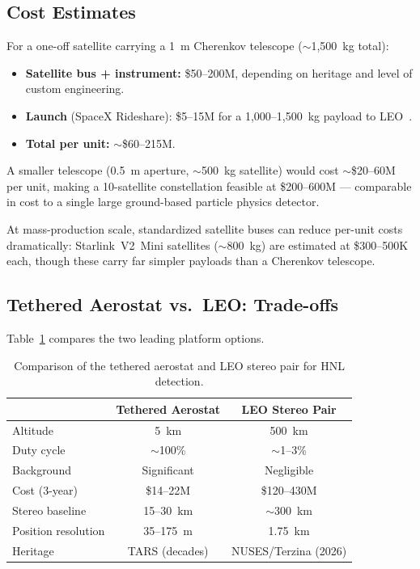 \documentclass[11pt]{article}
\begin{document}
\subsection{Cost Estimates}

For a one-off satellite carrying a 1~m Cherenkov telescope
($\sim$1,500~kg total):
\begin{itemize}[nosep]
  \item \textbf{Satellite bus + instrument:} \$50--200M, depending on
        heritage and level of custom engineering.
  \item \textbf{Launch} (SpaceX Rideshare): \$5--15M for a 1,000--1,500~kg
        payload to LEO~\cite{SpaceX-Rideshare}.
  \item \textbf{Total per unit:} $\sim$\$60--215M.
\end{itemize}

A smaller telescope (0.5~m aperture, $\sim$500~kg satellite) would
cost $\sim$\$20--60M per unit, making a 10-satellite constellation
feasible at \$200--600M --- comparable in cost to a single large
ground-based particle physics detector.

At mass-production scale, standardized satellite buses can reduce
per-unit costs dramatically: Starlink~V2~Mini satellites
($\sim$800~kg) are estimated at \$300--500K each, though these carry
far simpler payloads than a Cherenkov telescope.

\subsection{Tethered Aerostat vs.\ LEO: Trade-offs}

Table~\ref{tab:aerostat_vs_leo} compares the two leading platform
options.

\begin{table}[h]
\centering
\small
\begin{tabular}{lcc}
\toprule
& \textbf{Tethered Aerostat} & \textbf{LEO Stereo Pair} \\
\midrule
Altitude           & 5~km          & 500~km \\
Duty cycle         & $\sim$100\%   & $\sim$1--3\% \\
Background         & Significant   & Negligible \\
Cost (3-year)      & \$14--22M     & \$120--430M \\
Stereo baseline    & 15--30~km     & $\sim$300~km \\
Position resolution & 35--175~m    & 1.75~km \\
Heritage           & TARS (decades) & NUSES/Terzina (2026) \\
\bottomrule
\end{tabular}
\caption{Comparison of the tethered aerostat and LEO stereo pair
for HNL detection.}
\label{tab:aerostat_vs_leo}
\end{table}
\end{document}
